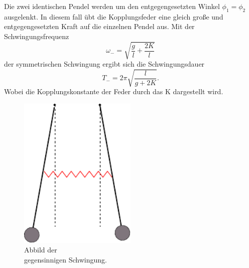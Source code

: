 \begin{minipage}[t]{0.5\textwidth}
\label{sub:Gegen}
Die zwei identischen Pendel werden um den entgegengesetzten Winkel $\phi_1 = \phi_2$ ausgelenkt.
In diesem fall übt die Kopplungsfeder eine gleich große und entgegengesetzten Kraft auf die einzelnen Pendel aus.
Mit der Schwingungsfrequenz
\begin{equation}
    \omega_- = \sqrt{\frac{g}{l} + \frac{2K}{l}}
    \label{eqn:omega-}
\end{equation}
der symmetrischen Schwingung ergibt sich die Schwingungsdauer
\begin{equation}
    T_- = 2\pi \sqrt{\frac{l}{g+2K}}.
    \label{eqn:T-}
\end{equation}
Wobei die Kopplungskonstante der Feder durch das K dargestellt wird.
\end{minipage}
\begin{minipage}[t]{0.5\textwidth}
    \begin{figure}[H]
        \centering
        \includegraphics[width=0.5\textwidth]{build/Abb_2.pdf}
        \caption{Abbild der \\gegensinnigen Schwingung. \cite{V106}}
        \label{fig:gegen}
      \end{figure}
\end{minipage}
